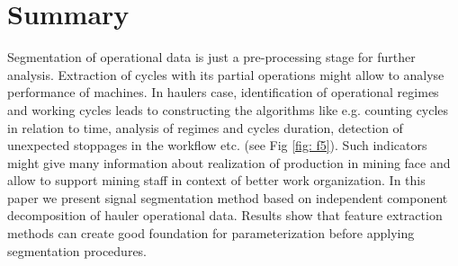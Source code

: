 \section{Summary}
Segmentation of operational data is just a pre-processing stage for further analysis. Extraction of cycles with its partial operations might allow to analyse performance of machines. In haulers case, identification of operational regimes and working cycles leads to constructing the algorithms like e.g. counting cycles in relation to time, analysis of regimes and cycles duration, detection of unexpected stoppages in the workflow etc. (see Fig \ref{fig: f5}). Such indicators might give many information about realization of production in mining face and allow to support mining staff in context of better work organization.
In this paper we present signal segmentation method based on independent component decomposition of hauler operational data. Results show that feature extraction methods can create good foundation for parameterization before applying segmentation procedures.

